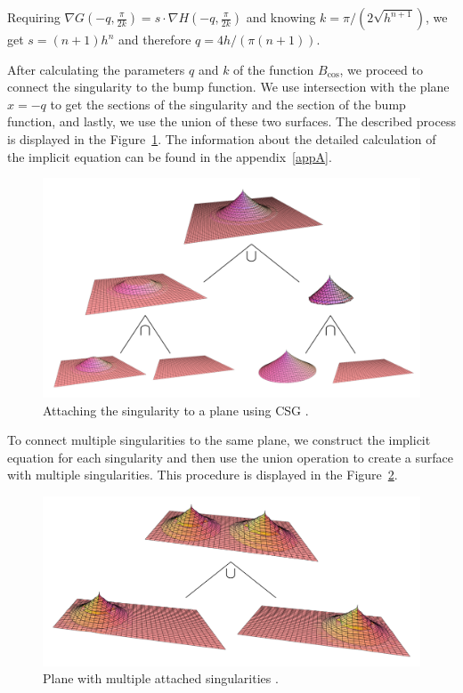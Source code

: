 Requiring $\nabla G (-q, \frac{\pi}{2k}) = s \cdot \nabla H (-q, \frac{\pi}{2k})$
and knowing $k=\pi/(2\sqrt{h^{n+1}})$, we get $s=(n+1)h^n$ and therefore $q=4h/(\pi(n+1))$.

After calculating the parameters $q$ and $k$ of the function $B_{\cos}$, 
we proceed to connect the singularity to the bump function.
We use intersection with the plane $x=-q$ to get the sections of the singularity
and the section of the bump function, and lastly, we use the union of these two 
surfaces. The described process is displayed in the Figure~\ref{img:26}.
The information about the detailed calculation of the implicit equation 
can be found in the appendix~\ref{appA}.

\begin{figure}
    \centerline{\includegraphics[scale=0.5]{images/img26}}
    \caption[Attaching the singularity to a plane using CSG]
    {Attaching the singularity to a plane using CSG \cite{calcplot3d}.}
    \label{img:26}
\end{figure}

To connect multiple singularities to the same plane, we construct the implicit
equation for each singularity and then use the union operation to
create a surface with multiple singularities. This procedure is displayed in
the Figure~\ref{img:28}.

\begin{figure}
    \centerline{\includegraphics[scale=0.5]{images/img28}}
    \caption[Plane with multiple attached singularities]
    {Plane with multiple attached singularities \cite{calcplot3d}.}
    \label{img:28}
\end{figure}

